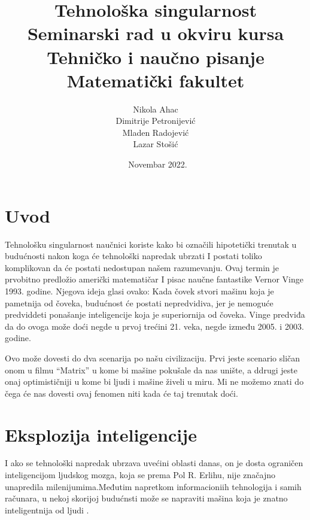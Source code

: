 \documentclass[a4paper]{article}
\begin{document}
\title{Tehnološka singularnost\\ \small{Seminarski rad u okviru kursa\\Tehničko i naučno pisanje\\ Matematički fakultet}}

\author{Nikola Ahac\\ Dimitrije Petronijević\\ Mladen Radojević\\ Lazar Stošić}
\date{~Novembar 2022.}
\maketitle



\tableofcontents

\newpage

\section{Uvod}
\label{sec:uvod}
Tehnološku singularnost naučnici koriste kako bi označili hipotetički trenutak u budućnosti nakon koga će tehnološki napredak ubrzati I postati toliko komplikovan da će postati nedostupan našem razumevanju. Ovaj termin je prvobitno predložio američki matematičar I pisac naučne fantastike Vernor Vinge 1993. godine. Njegova ideja glasi ovako: Kada čovek stvori mašinu koja je pametnija od čoveka, budućnost će postati nepredvidiva, jer je nemoguće predviddeti ponašanje inteligencije koja je superiornija od čoveka. Vinge predviđa da do ovoga može doći negde u prvoj trećini 21. veka, negde između 2005. i 2003. godine. 

Ovo može dovesti do dva scenarija po našu civilizaciju. Prvi jeste scenario sličan onom u filmu “Matrix” u kome bi mašine pokušale da nas unište, a ddrugi jeste onaj optimističniji u kome bi ljudi i mašine živeli u miru. Mi ne možemo znati do čega će nas dovesti ovaj fenomen niti kada će taj trenutak doći.

\section{Eksplozija inteligencije}
I ako se tehnološki napredak ubrzava uvećini oblasti danas, on je dosta ograničen inteligencijom ljudskog mozga, koja se prema Pol R. Erlihu, nije značajno unapredila milenijumima.\cite{ref 1}Međutim napretkom informacioniih tehnologija i samih računara, u nekoj skorijoj budućnsti može se napraviti mašina koja je znatno inteligentnija od ljudi .\cite{ref 2}
\end{document}
